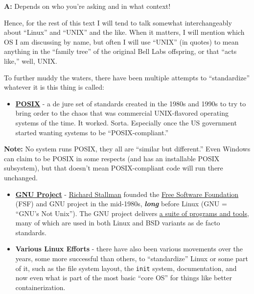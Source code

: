 \documentclass[10pt,]{book}
\numberwithin{figure}{chapter}
\begin{document}
\textbf{A:} Depends on who you're asking and in what context!

Hence, for the rest of this text I will tend to talk somewhat
interchangeably about ``Linux'' and ``UNIX'' and the like. When it
matters, I will mention which OS I am discussing by name, but often I
will use ``UNIX'' (in quotes) to mean anything in the ``family tree'' of
the original Bell Labs offspring, or that ``acts like,'' well, UNIX.

To further muddy the waters, there have been multiple attempts to
``standardize'' whatever it is this thing is called:

\begin{itemize}
\itemsep1pt\parskip0pt
\item
  \href{https://en.wikipedia.org/wiki/POSIX}{\textbf{POSIX}} -
   a de jure set of standards created in the 1980s and
  1990s to try to bring order to the chaos that was commercial
  UNIX-flavored operating systems of the time. It worked. Sorta.
  Especially once the US government started wanting systems to be
  ``POSIX-compliant.''
\end{itemize}

\textbf{Note:} No system runs POSIX, they all are ``similar but
different.'' Even Windows can claim to be POSIX in some respects (and
has an installable POSIX subsystem), but that doesn't mean
POSIX-compliant code will run there unchanged.

\begin{itemize}
\item
  \href{https://en.wikipedia.org/wiki/GNU_Project}{\textbf{GNU Project}}
  - \href{https://en.wikipedia.org/wiki/Richard_Stallman}{Richard
  Stallman} founded the
  \href{https://en.wikipedia.org/wiki/Free_Software_Foundation}{Free
  Software Foundation} (FSF) and GNU project  in the
  mid-1980s, \textbf{\emph{long}} before Linux (GNU = ``GNU's Not
  Unix''). The GNU project delivers
  \href{https://www.gnu.org/software/software.html}{a suite of programs
  and tools}, many of which are used in both Linux and BSD variants as
  de facto standards.
\item
  \textbf{Various Linux Efforts} - there have also been various
  movements over the years, some more successful than others, to
  ``standardize'' Linux or some part of it, such as the file system
  layout, the \texttt{init} system, documentation, and now even what is
  part of the most basic ``core OS'' for things like better
  containerization.
\end{itemize}
\end{document}
